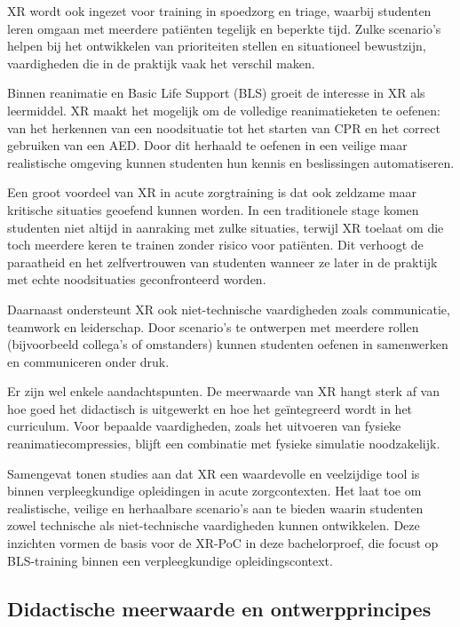 XR wordt ook ingezet voor training in spoedzorg en triage, waarbij studenten leren omgaan met meerdere patiënten tegelijk en beperkte tijd. Zulke scenario’s helpen bij het ontwikkelen van prioriteiten stellen en situationeel bewustzijn, vaardigheden die in de praktijk vaak het verschil maken.

Binnen reanimatie en Basic Life Support (BLS) groeit de interesse in XR als leermiddel. XR maakt het mogelijk om de volledige reanimatieketen te oefenen: van het herkennen van een noodsituatie tot het starten van CPR en het correct gebruiken van een AED. Door dit herhaald te oefenen in een veilige maar realistische omgeving kunnen studenten hun kennis en beslissingen automatiseren.

Een groot voordeel van XR in acute zorgtraining is dat ook zeldzame maar kritische situaties geoefend kunnen worden. In een traditionele stage komen studenten niet altijd in aanraking met zulke situaties, terwijl XR toelaat om die toch meerdere keren te trainen zonder risico voor patiënten. Dit verhoogt de paraatheid en het zelfvertrouwen van studenten wanneer ze later in de praktijk met echte noodsituaties geconfronteerd worden.

Daarnaast ondersteunt XR ook niet-technische vaardigheden zoals communicatie, teamwork en leiderschap. Door scenario’s te ontwerpen met meerdere rollen (bijvoorbeeld collega’s of omstanders) kunnen studenten oefenen in samenwerken en communiceren onder druk.

Er zijn wel enkele aandachtspunten. De meerwaarde van XR hangt sterk af van hoe goed het didactisch is uitgewerkt en hoe het geïntegreerd wordt in het curriculum. Voor bepaalde vaardigheden, zoals het uitvoeren van fysieke reanimatiecompressies, blijft een combinatie met fysieke simulatie noodzakelijk.

Samengevat tonen studies aan dat XR een waardevolle en veelzijdige tool is binnen verpleegkundige opleidingen in acute zorgcontexten. Het laat toe om realistische, veilige en herhaalbare scenario’s aan te bieden waarin studenten zowel technische als niet-technische vaardigheden kunnen ontwikkelen. Deze inzichten vormen de basis voor de XR-PoC in deze bachelorproef, die focust op BLS-training binnen een verpleegkundige opleidingscontext.

\subsection{Didactische meerwaarde en ontwerpprincipes}

